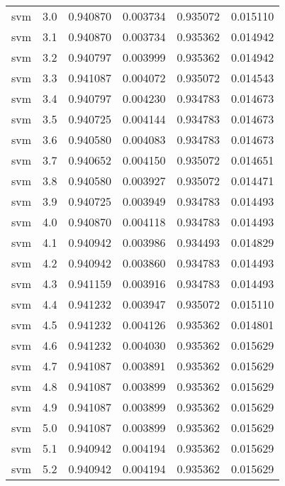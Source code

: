 \begin{tabular}{lrrrrr}
     svm &        3.0 &    0.940870 &   0.003734 &   0.935072 &  0.015110 \\
     svm &        3.1 &    0.940870 &   0.003734 &   0.935362 &  0.014942 \\
     svm &        3.2 &    0.940797 &   0.003999 &   0.935362 &  0.014942 \\
     svm &        3.3 &    0.941087 &   0.004072 &   0.935072 &  0.014543 \\
     svm &        3.4 &    0.940797 &   0.004230 &   0.934783 &  0.014673 \\
     svm &        3.5 &    0.940725 &   0.004144 &   0.934783 &  0.014673 \\
     svm &        3.6 &    0.940580 &   0.004083 &   0.934783 &  0.014673 \\
     svm &        3.7 &    0.940652 &   0.004150 &   0.935072 &  0.014651 \\
     svm &        3.8 &    0.940580 &   0.003927 &   0.935072 &  0.014471 \\
     svm &        3.9 &    0.940725 &   0.003949 &   0.934783 &  0.014493 \\
     svm &        4.0 &    0.940870 &   0.004118 &   0.934783 &  0.014493 \\
     svm &        4.1 &    0.940942 &   0.003986 &   0.934493 &  0.014829 \\
     svm &        4.2 &    0.940942 &   0.003860 &   0.934783 &  0.014493 \\
     svm &        4.3 &    0.941159 &   0.003916 &   0.934783 &  0.014493 \\
     svm &        4.4 &    0.941232 &   0.003947 &   0.935072 &  0.015110 \\
     svm &        4.5 &    0.941232 &   0.004126 &   0.935362 &  0.014801 \\
     svm &        4.6 &    0.941232 &   0.004030 &   0.935362 &  0.015629 \\
     svm &        4.7 &    0.941087 &   0.003891 &   0.935362 &  0.015629 \\
     svm &        4.8 &    0.941087 &   0.003899 &   0.935362 &  0.015629 \\
     svm &        4.9 &    0.941087 &   0.003899 &   0.935362 &  0.015629 \\
     svm &        5.0 &    0.941087 &   0.003899 &   0.935362 &  0.015629 \\
     svm &        5.1 &    0.940942 &   0.004194 &   0.935362 &  0.015629 \\
     svm &        5.2 &    0.940942 &   0.004194 &   0.935362 &  0.015629 \\

\end{tabular}
